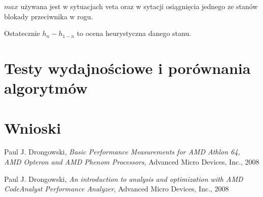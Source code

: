 \documentclass{scrartcl}
\begin{document}
$max$ używana jest w sytuacjach veta oraz w sytacji osiągnięcia jednego ze stanów blokady przeciwnika w rogu.

Ostatecznie $h_{n} - h_{1-n}$ to ocena heurystyczna danego stanu.

\section{Testy wydajnościowe i porównania algorytmów}

\section{Wnioski}

\begin{thebibliography}{9}

 Paul J. Drongowski,
  \emph{Basic Performance Measurements for AMD Athlon 64, 
AMD Opteron and AMD Phenom Processors}, Advanced Micro Devices, Inc.,
  2008

 Paul J. Drongowski,
  \emph{An introduction to analysis and optimization 
with AMD CodeAnalyst Performance Analyzer}, Advanced Micro Devices, Inc.,
  2008

\end{thebibliography}
\end{document}
